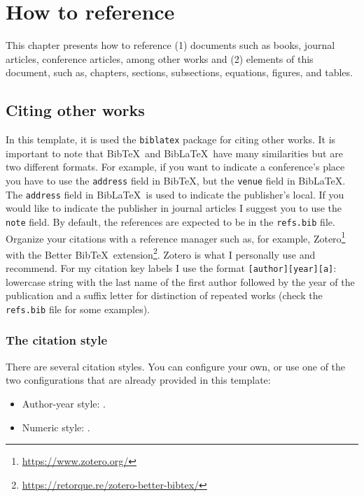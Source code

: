\chapter{How to reference}
\label{c3}

This chapter presents how to reference (1) documents such as books, journal articles, conference articles, among other works and (2) elements of this document, such as, chapters, sections, subsections, equations, figures, and tables.

\section{Citing other works}
\label{c3:s:citing-other-works}

In this template, it is used the \verb+biblatex+ package for citing other works. It is important to note that Bib\TeX\ and Bib\LaTeX\ have many similarities but are two different formats. For example, if you want to indicate a conference's place you have to use the \verb+address+ field in Bib\TeX, but the \verb+venue+ field in Bib\LaTeX. The \verb+address+ field in Bib\LaTeX\ is used to indicate the publisher's local. If you would like to indicate the publisher in journal articles I suggest you to use the \verb+note+ field. By default, the references are expected to be in the \verb+refs.bib+ file. Organize your citations with a reference manager such as, for example, Zotero\footnote{\url{https://www.zotero.org/}} with the Better Bib\TeX\ extension\footnote{\url{https://retorque.re/zotero-better-bibtex/}}. Zotero is what I personally use and recommend. For my citation key labels I use the format \texttt{[author][year][a]}: lowercase string with the last name of the first author followed by the year of the publication and a suffix letter for distinction of repeated works (check the \texttt{refs.bib} file for some examples).

\subsection{The citation style}
\label{c3:ss:the-citation-style}

There are several citation styles. You can configure your own, or use one of the two configurations that are already provided in this template:

\begin{itemize}
\item
Author-year style: \verb++.
\item
Numeric style: \verb++.
\end{itemize}

